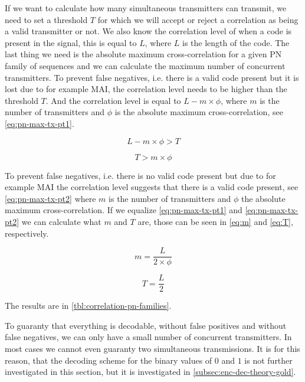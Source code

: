 		If we want to calculate how many simultaneous transmitters can transmit, we need to set a threshold $T$ for which we will accept or reject a correlation as being a valid transmitter or not.
		We also know the correlation level of when a code is present in the signal, this is equal to $L$, where $L$ is the length of the code.
		The last thing we need is the absolute maximum cross-correlation for a given PN family of sequences and we can calculate the maximum number of concurrent transmitters.
		To prevent false negatives, i.e. there is a valid code present but it is lost due to for example MAI, the correlation level needs to be higher than the threshold $T$. 
		And the correlation level is equal to $L - m \times \phi$, where $m$ is the number of transmitters and $\phi$ is the absolute maximum cross-correlation, see \autoref{eq:pn-max-tx-pt1}.

		\begin{equation}
			\label{eq:pn-max-tx-pt1}
			L - m \times \phi > T
		\end{equation}

		\begin{equation}
			\label{eq:pn-max-tx-pt2}
			T > m \times \phi
		\end{equation}

		To prevent false negatives, i.e. there is no valid code present but due to for example MAI the correlation level suggests that there is a valid code present, see \autoref{eq:pn-max-tx-pt2} where $m$ is the number of transmitters and $\phi$ the absolute maximum cross-correlation.
		If we equalize \autoref{eq:pn-max-tx-pt1} and \autoref{eq:pn-max-tx-pt2} we can calculate what $m$ and $T$ are, those can be seen in \autoref{eq:m} and \autoref{eq:T}, respectively.

		\begin{equation}
			\label{eq:m}
			m = \frac{L}{2 \times \phi}
		\end{equation}

		\begin{equation}
			\label{eq:T}
			T = \frac{L}{2}
		\end{equation}

		The results are in \autoref{tbl:correlation-pn-families}.
		
		To guaranty that everything is decodable, without false positives and without false negatives, we can only have a small number of concurrent transmitters.
		In most cases we cannot even guaranty two simultaneous transmissions.
		It is for this reason, that the decoding scheme for the binary values of $0$ and $1$ is not further investigated in this section, but it is investigated in  \autoref{subsec:enc-dec-theory-gold}.







